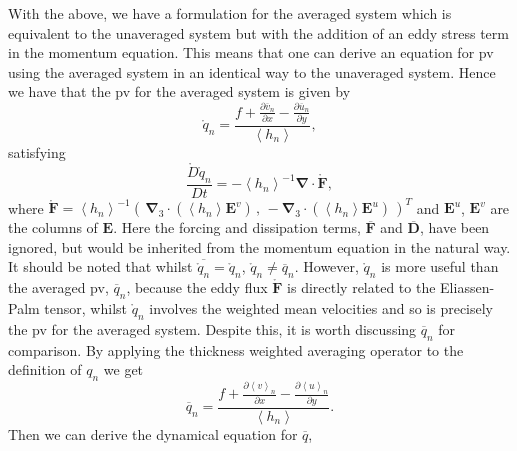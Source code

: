 \documentclass[12pt,a4paper]{report}
\newcommand*\thkmean[1]{\overline{#1}}
\newcommand*\nthkmean[1]{\left\langle{#1}\right\rangle}
\newcommand*\spec[1]{\mathring{#1}}
\newcommand*{\partialdiff}[2][{}]{\frac{\partial #1}{\partial #2}}
\begin{document}
    With the above, we have a formulation for the 
    averaged system which is equivalent to the
    unaveraged system but with the addition of an
    eddy stress term in the momentum equation.
    This means that one can derive an equation for \gls{pv} using the averaged system
    in an identical way to the unaveraged 
    system. Hence we have that the \gls{pv} for
    the averaged system is given by 
    \begin{equation}
    \spec{q}_{n} =
    \frac{f+\partialdiff[\thkmean{v}_{n}]{x}-\partialdiff[\thkmean{u}_{n}]{y}}
    {\nthkmean{h_{n}}},
    \end{equation} 
    satisfying
    \begin{equation}
    \frac{\spec{D}\spec{q}_{n}}{D t} 
    =   -\nthkmean{h_{n}}^{-1}
    \boldsymbol{\nabla}
    \cdot\boldsymbol{\spec{F}},
    \label{avpveq}
    \end{equation} 
    where $
    \boldsymbol{\spec{F}}
    =   \nthkmean{h_{n}}^{-1}\left( \,
    \boldsymbol{\nabla}_{3}
    \cdot(\nthkmean{h_{n}}
    \boldsymbol{E}^{v}) \, , \,
    - \boldsymbol{\nabla}_{3}
    \cdot(\nthkmean{h_{n}}
    \boldsymbol{E}^{u}) \, \right)^{T}  $ and $\boldsymbol{E}^{u}$,  $\boldsymbol{E}^{v}$ are the
    columns of  $\boldsymbol{E}$. Here the forcing and dissipation terms, $\thkmean{
    	\boldsymbol{F}}$ and $\thkmean{
    	\boldsymbol{D}}$, have been ignored, but
    would be inherited from the momentum
    equation in the natural way. It should be noted that whilst $\thkmean{\spec{q}_{n}} = \spec{q}_{n}$, $\spec{q}_{n} \neq \thkmean{q}_{n}$.  However,
    $\spec{q}_{n}$ is 
    more useful than the averaged \gls{pv}, $\thkmean{q}_{n}$, because the eddy flux $
    \boldsymbol{\spec{F}} $ is directly related to the Eliassen-Palm tensor, whilst  $\spec{q}_{n}$ involves
    the weighted mean velocities and so is precisely the \gls{pv} for the averaged system. 
    Despite this, it is worth discussing $\thkmean{q}_{n}$ for 
    comparison. By applying the thickness weighted averaging operator to the 
    definition of $q_{n}$ we get 
    \begin{equation}
    \thkmean{q}_{n} =
    \frac{f+\partialdiff[\nthkmean{v}_{n}]{x}-\partialdiff[\nthkmean{u}_{n}]{y}}
    {\nthkmean{h_{n}}}.
    \end{equation} 
    Then we can derive the dynamical equation for
    $ \thkmean{q}$,
\end{document}
